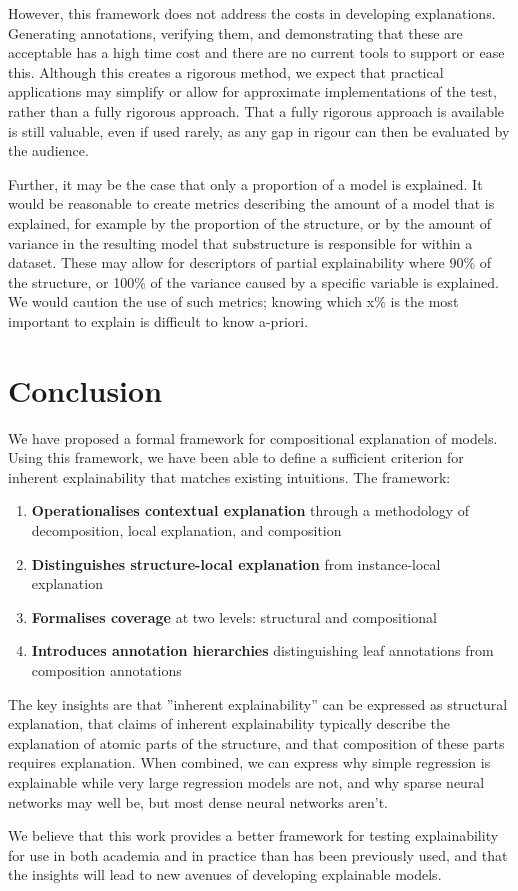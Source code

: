 \documentclass{article}
\begin{document}
However, this framework does not address the costs in developing explanations. Generating annotations, verifying them, and demonstrating that these are acceptable has a high time cost and there are no current tools to support or ease this. Although this creates a rigorous method, we expect that practical applications may simplify or allow for approximate implementations of the test, rather than a fully rigorous approach. That a fully rigorous approach is available is still valuable, even if used rarely, as any gap in rigour can then be evaluated by the audience.

Further, it may be the case that only a proportion of a model is explained. It would be reasonable to create metrics describing the amount of a model that is explained, for example by the proportion of the structure, or by the amount of variance in the resulting model that substructure is responsible for within a dataset. These may allow for descriptors of partial explainability where 90\% of the structure, or 100\% of the variance caused by a specific variable is explained. We would caution the use of such metrics; knowing which x\% is the most important to explain is difficult to know a-priori.


\section{Conclusion}

We have proposed a formal framework for compositional explanation of models. Using this framework, we have been able to define a sufficient criterion for inherent explainability that matches existing intuitions. The framework:

\begin{enumerate}
    \item \textbf{Operationalises contextual explanation} through a methodology of decomposition, local explanation, and composition
    \item \textbf{Distinguishes structure-local explanation} from instance-local explanation
    \item \textbf{Formalises coverage} at two levels: structural and compositional
    \item \textbf{Introduces annotation hierarchies} distinguishing leaf annotations from composition annotations
\end{enumerate}

The key insights are that ''inherent explainability'' can be expressed as structural explanation, that claims of inherent explainability typically describe the explanation of atomic parts of the structure, and that composition of these parts requires explanation. When combined, we can express why simple regression is explainable while very large regression models are not, and why sparse neural networks may well be, but most dense neural networks aren't.

We believe that this work provides a better framework for testing explainability for use in both academia and in practice than has been previously used, and that the insights will lead to new avenues of developing explainable models.



\end{document}
